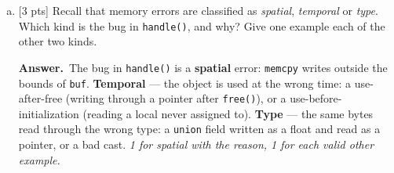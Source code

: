 \documentclass[11pt]{article}
\newcommand{\answer}[1]{\begin{ansbox}{\bfseries Answer.}\ #1\end{ansbox}}
\newcommand{\gap}{}
\newcommand{\answer}[1]{}
\newcommand{\gap}{\par\vfill\newpage}
\newcommand{\pts}[1]{\textcolor{muted}{\small[#1 pts]}}
\begin{document}
\begin{enumerate}[(a)]
        \item \pts{3} Recall that memory errors are classified as \emph{spatial}, \emph{temporal} or \emph{type}. Which kind is the bug in \texttt{handle()}, and why? Give one example each of the other two kinds.
        \answer{The bug in \texttt{handle()} is a \textbf{spatial} error: \texttt{memcpy} writes outside the bounds of \texttt{buf}. \textbf{Temporal} --- the object is used at the wrong time: a use-after-free (writing through a pointer after \texttt{free()}), or a use-before-initialization (reading a local never assigned to). \textbf{Type} --- the same bytes read through the wrong type: a \texttt{union} field written as a float and read as a pointer, or a bad cast. \emph{1 for spatial with the reason, 1 for each valid other example.}}
    \end{enumerate}
    \gap
\end{document}
